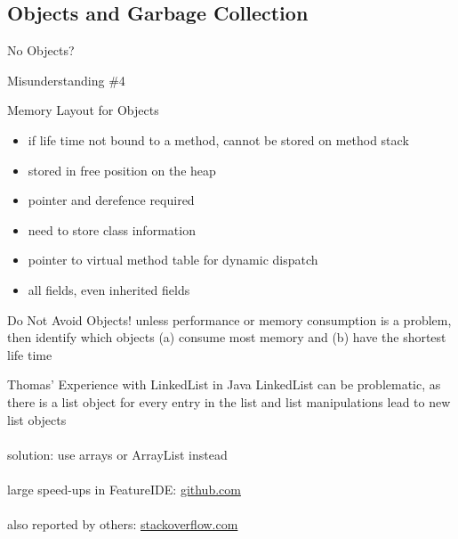 \subsection{Objects and Garbage Collection}
\begin{frame}{No Objects?}
	\begin{fancycolumns}
		\begin{example}{Misunderstanding \#4}
		\end{example}
		\begin{definition}{Memory Layout for Objects}
			\begin{itemize}
				\item if life time not bound to a method, cannot be stored on method stack
				\item stored in free position on the heap
				\item pointer and derefence required
				\item need to store class information
				\item pointer to virtual method table for dynamic dispatch
				\item all fields, even inherited fields
			\end{itemize}
		\end{definition}
		\nextcolumn
		\begin{note}{Do Not Avoid Objects!}
			unless performance or memory consumption is a problem, then identify which objects (a) consume most memory and (b) have the shortest life time
		\end{note}
		\begin{example}{Thomas' Experience with LinkedList in Java}
			LinkedList can be problematic, as there is a list object for every entry in the list and list manipulations lead to new list objects\\~\\solution: use arrays or ArrayList instead\\~\\large speed-ups in FeatureIDE: \href{https://github.com/FeatureIDE/FeatureIDE/blob/b7732df29da1652c74b4342cd087bba436919815/plugins/de.ovgu.featureide.fm.core/src/org/prop4j/Node.java\#L46}{github.com}\\~\\also reported by others: \href{https://stackoverflow.com/questions/322715/when-to-use-linkedlist-over-arraylist-in-java}{stackoverflow.com}
		\end{example}
	\end{fancycolumns}
\end{frame}

